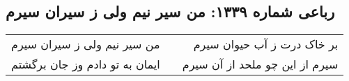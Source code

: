 \begin{center}
\section*{رباعی شماره ۱۳۳۹: من سیر نیم ولی ز سیران سیرم}
\label{sec:1339}
\begin{longtable}{l p{0.5cm} r}
من سیر نیم ولی ز سیران سیرم
&&
بر خاک درت ز آب حیوان سیرم
\\
ایمان به تو دادم وز جان برگشتم
&&
سیرم از این چو ملحد از آن سیرم
\\
\end{longtable}
\end{center}
